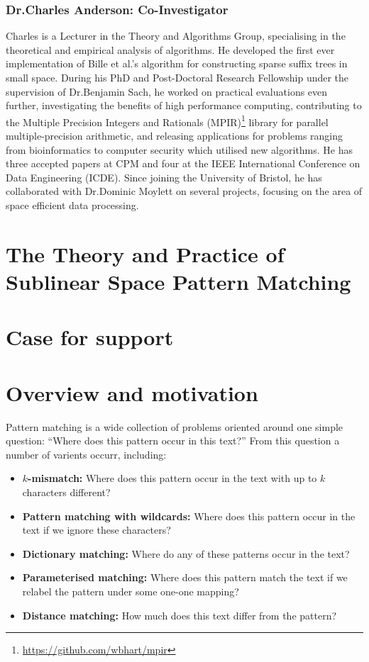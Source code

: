 \documentclass[a4paper,11pt]{article}
\begin{document}
    \subsubsection*{Dr.\@ Charles Anderson: Co-Investigator}

    Charles is a Lecturer in the Theory and Algorithms Group, specialising in the theoretical and empirical analysis of algorithms. He developed the first ever implementation of Bille et al.'s algorithm for constructing sparse suffix trees in small space. During his PhD and Post-Doctoral Research Fellowship under the supervision of Dr.\@ Benjamin Sach, he worked on practical evaluations even further, investigating the benefits of high performance computing, contributing to the Multiple Precision Integers and Rationals (MPIR)\footnote{\url{https://github.com/wbhart/mpir}} library for parallel multiple-precision arithmetic, and releasing applications for problems ranging from bioinformatics to computer security which utilised new algorithms. He has three accepted papers at CPM and four at the IEEE International Conference on Data Engineering (ICDE). Since joining the University of Bristol, he has collaborated with Dr.\@ Dominic Moylett on several projects, focusing on the area of space efficient data processing.

    \newpage
    \section*{The Theory and Practice of Sublinear Space Pattern Matching}
    \section*{Case for support}

    \section{Overview and motivation}

    Pattern matching is a wide collection of problems oriented around one simple question: ``Where does this pattern occur in this text?'' From this question a number of varients occurr, including:

    \begin{itemize}
        \item \textbf{$k$-mismatch:} Where does this pattern occur in the text with up to $k$ characters different?
        \item \textbf{Pattern matching with wildcards:} Where does this pattern occur in the text if we ignore these characters?
        \item \textbf{Dictionary matching:} Where do any of these patterns occur in the text?
        \item \textbf{Parameterised matching:} Where does this pattern match the text if we relabel the pattern under some one-one mapping?
        \item \textbf{Distance matching:} How much does this text differ from the pattern?
    \end{itemize}
\end{document}
